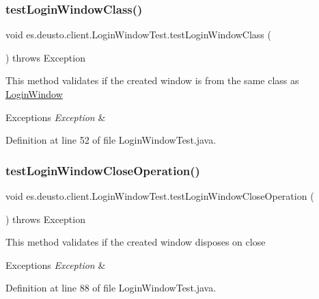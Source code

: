 \subsubsection{\texorpdfstring{test\+Login\+Window\+Class()}{testLoginWindowClass()}}
{\footnotesize\ttfamily void es.\+deusto.\+client.\+Login\+Window\+Test.\+test\+Login\+Window\+Class (\begin{DoxyParamCaption}{ }\end{DoxyParamCaption}) throws Exception}

This method validates if the created window is from the same class as \hyperlink{classes_1_1deusto_1_1client_1_1_login_window}{Login\+Window}


\begin{DoxyExceptions}{Exceptions}
{\em Exception} & \\
\hline
\end{DoxyExceptions}


Definition at line 52 of file Login\+Window\+Test.\+java.

\mbox{\label{classes_1_1deusto_1_1client_1_1_login_window_test_a65a992d1184421c2aff6afaf3cedbe7c}} 
\subsubsection{\texorpdfstring{test\+Login\+Window\+Close\+Operation()}{testLoginWindowCloseOperation()}}
{\footnotesize\ttfamily void es.\+deusto.\+client.\+Login\+Window\+Test.\+test\+Login\+Window\+Close\+Operation (\begin{DoxyParamCaption}{ }\end{DoxyParamCaption}) throws Exception}

This method validates if the created window disposes on close


\begin{DoxyExceptions}{Exceptions}
{\em Exception} & \\
\hline
\end{DoxyExceptions}


Definition at line 88 of file Login\+Window\+Test.\+java.

